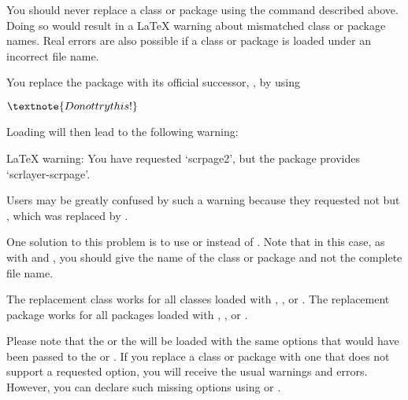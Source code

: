 \begin{Declaration}
\end{Declaration}%
You should never
replace a class or package using the 
command described above. Doing so would result in a \LaTeX{} warning about
mismatched class or package names. Real errors are also possible if a class or
package is loaded under an incorrect file name.
\begin{Example}
  You replace the  package with its official successor,
  , by using
\begin{lstcode}[escapechar=\$]
  $\textnote{Do not try this!}$
\end{lstcode}
  Loading  will then lead to the following warning:
\begin{lstcode}
  LaTeX warning: You have requested `scrpage2',
                 but the package provides `scrlayer-scrpage'.
\end{lstcode}
  Users may be greatly confused by such a warning because they requested not
   but , which was replaced by
  .
\end{Example}
One solution to this problem is to use  or
 instead of . Note
that in this case, as with  and , you
should give the name of the class or package and not the complete file name.

The replacement class works for all classes loaded with
, , or . The
replacement package works for all packages loaded with
, , or
.

Please note that the  or the
 will be loaded with the same options that would
have been passed to the  or . If
you replace a class or package with one that does not support a requested
option, you will receive the usual warnings and errors. However, you can
declare such missing options using  or
.

